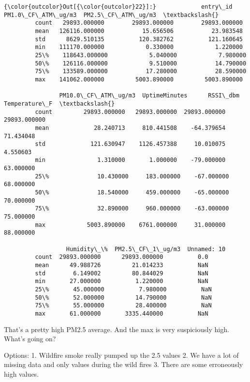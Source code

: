 \documentclass[11pt]{article}
\begin{document}
\begin{Verbatim}[commandchars=\\\{\}]
{\color{outcolor}Out[{\color{outcolor}22}]:}             entry\_id  PM1.0\_CF\_ATM\_ug/m3  PM2.5\_CF\_ATM\_ug/m3  \textbackslash{}
         count   29893.000000        29893.000000        29893.000000   
         mean   126116.000000           15.656506           23.983548   
         std      8629.510135          120.382762          121.160645   
         min    111170.000000            0.330000            1.220000   
         25\%    118643.000000            5.040000            7.980000   
         50\%    126116.000000            9.510000           14.790000   
         75\%    133589.000000           17.280000           28.590000   
         max    141062.000000         5003.890000         5003.890000   
         
                PM10.0\_CF\_ATM\_ug/m3  UptimeMinutes      RSSI\_dbm  Temperature\_F  \textbackslash{}
         count         29893.000000   29893.000000  29893.000000   29893.000000   
         mean             28.240713     810.441508    -64.379654      71.434048   
         std             121.630947    1126.457388     10.010075       4.550603   
         min               1.310000       1.000000    -79.000000      63.000000   
         25\%              10.430000     183.000000    -67.000000      68.000000   
         50\%              18.540000     459.000000    -65.000000      70.000000   
         75\%              32.890000     960.000000    -63.000000      75.000000   
         max            5003.890000    6761.000000     31.000000      88.000000   
         
                  Humidity\_\%  PM2.5\_CF\_1\_ug/m3  Unnamed: 10  
         count  29893.000000      29893.000000          0.0  
         mean      49.988726         21.014233          NaN  
         std        6.149002         80.844029          NaN  
         min       27.000000          1.220000          NaN  
         25\%       45.000000          7.980000          NaN  
         50\%       52.000000         14.790000          NaN  
         75\%       55.000000         28.400000          NaN  
         max       61.000000       3335.440000          NaN  
\end{Verbatim}
            
    That's a pretty high PM2.5 average. And the max is very suspiciously
high. What's going on?

Options: 1. Wildfire smoke really pumped up the 2.5 values 2. We have a
lot of missing data and only values during the wild fires 3. There are
some erroneously high values.
\end{document}
